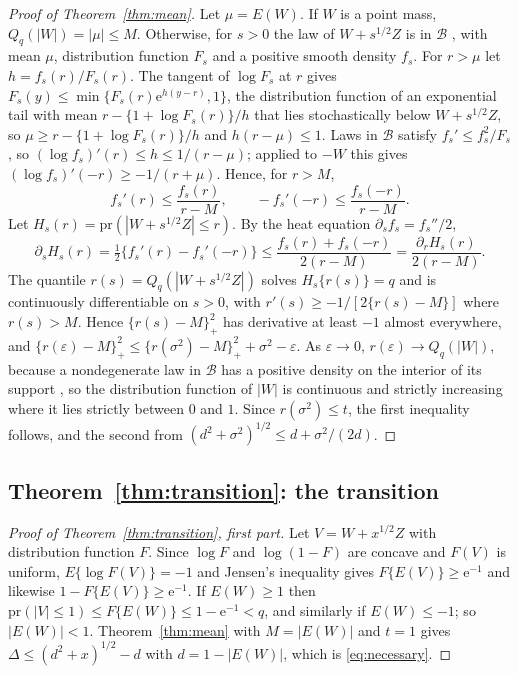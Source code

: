 \documentclass[11pt]{article}
\renewcommand{\_}{\usc\allowbreak}
\newcommand{\pr}{\mathrm{pr}}
\begin{document}
\begin{proof}[Proof of Theorem~\ref{thm:mean}]
Let $\mu = E(W)$. If $W$ is a point mass, $Q_q(|W|) = |\mu| \le M$. Otherwise, for $s > 0$ the law of $W + s^{1/2}Z$ is in $\mathcal B$ \citep{saumard2019}, with mean $\mu$, distribution function $F_s$ and a positive smooth density $f_s$. For $r > \mu$ let $h = f_s(r)/F_s(r)$. The tangent of $\log F_s$ at $r$ gives $F_s(y) \le \min\{F_s(r)\mathrm{e}^{h(y - r)}, 1\}$, the distribution function of an exponential tail with mean $r - \{1 + \log F_s(r)\}/h$ that lies stochastically below $W + s^{1/2}Z$, so $\mu \ge r - \{1 + \log F_s(r)\}/h$ and $h(r - \mu) \le 1$. Laws in $\mathcal B$ satisfy $f_s' \le f_s^2/F_s$ \citep{dumbgen2017}, so $(\log f_s)'(r) \le h \le 1/(r - \mu)$; applied to $-W$ this gives $(\log f_s)'(-r) \ge -1/(r + \mu)$. Hence, for $r > M$,
\[
f_s'(r) \le \frac{f_s(r)}{r - M}, \qquad -f_s'(-r) \le \frac{f_s(-r)}{r - M}.
\]
Let $H_s(r) = \pr(|W + s^{1/2}Z| \le r)$. By the heat equation $\partial_s f_s = f_s''/2$,
\[
\partial_s H_s(r) = \tfrac12\{f_s'(r) - f_s'(-r)\} \le \frac{f_s(r) + f_s(-r)}{2(r - M)} = \frac{\partial_r H_s(r)}{2(r - M)}.
\]
The quantile $r(s) = Q_q(|W + s^{1/2}Z|)$ solves $H_s\{r(s)\} = q$ and is continuously differentiable on $s > 0$, with $r'(s) \ge -1/[2\{r(s) - M\}]$ where $r(s) > M$. Hence $\{r(s) - M\}_+^2$ has derivative at least $-1$ almost everywhere, and $\{r(\varepsilon) - M\}_+^2 \le \{r(\sigma^2) - M\}_+^2 + \sigma^2 - \varepsilon$. As $\varepsilon \to 0$, $r(\varepsilon) \to Q_q(|W|)$, because a nondegenerate law in $\mathcal B$ has a positive density on the interior of its support \citep{dumbgen2017}, so the distribution function of $|W|$ is continuous and strictly increasing where it lies strictly between $0$ and $1$. Since $r(\sigma^2) \le t$, the first inequality follows, and the second from $(d^2 + \sigma^2)^{1/2} \le d + \sigma^2/(2d)$.
\end{proof}

\subsection*{Theorem~\ref{thm:transition}: the transition}

\begin{proof}[Proof of Theorem~\ref{thm:transition}, first part]
Let $V = W + x^{1/2}Z$ with distribution function $F$. Since $\log F$ and $\log(1 - F)$ are concave and $F(V)$ is uniform, $E\{\log F(V)\} = -1$ and Jensen's inequality gives $F\{E(V)\} \ge \mathrm{e}^{-1}$ and likewise $1 - F\{E(V)\} \ge \mathrm{e}^{-1}$. If $E(W) \ge 1$ then $\pr(|V| \le 1) \le F\{E(W)\} \le 1 - \mathrm{e}^{-1} < q$, and similarly if $E(W) \le -1$; so $|E(W)| < 1$. Theorem~\ref{thm:mean} with $M = |E(W)|$ and $t = 1$ gives $\Delta \le (d^2 + x)^{1/2} - d$ with $d = 1 - |E(W)|$, which is \eqref{eq:necessary}.
\end{proof}
\end{document}
